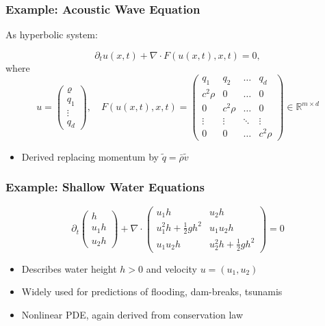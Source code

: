 \documentclass[aspectratio=169,11pt]{beamer}
\theoremstyle{definition}
\begin{document}
\begin{frame}
\frametitle{Example: Acoustic Wave Equation}
As hyperbolic system:

$$\partial_t u(x,t) + \nabla\cdot F(u(x,t),x,t) = 0,$$
where
$$u = \begin{pmatrix}
\varrho\\
q_1\\
\vdots\\
q_d
\end{pmatrix} ,\quad
F(u(x,t),x,t) = \left( \begin{matrix}
q_1  & q_2 & \dots & q_{d}\\
c^2\rho & 0 & \dots & 0\\
0 & c^2\rho & \dots & 0\\
\vdots & \vdots & \ddots & \vdots\\
0 & 0 & \dots & c^2\rho
\end{matrix} \right)\in \mathbb{R}^{m\times d} $$

\begin{itemize}
  \item Derived replacing momentum by $\tilde{q} = \bar{\rho} \tilde{v}$
\end{itemize}
\end{frame}


\begin{frame}
\frametitle{Example: Shallow Water Equations}

\begin{equation*}\label{eq:swe2D}
\partial_t \begin{pmatrix}
h\\
u_1h\\
u_2h
\end{pmatrix}+ \nabla\cdot
\left( \begin{matrix}
u_1h   & u_2h\\
u_1^2h + \frac{1}{2}gh^2 & u_1u_2h\\
u_1u_2h & u_2^2h + \frac{1}{2}gh^2
\end{matrix}\right) = 0
\end{equation*}

\begin{itemize}
  \item Describes water height $h>0$ and velocity $u=(u_1,u_2)$
  \item Widely used for predictions of flooding, dam-breaks, tsunamis
  \item Nonlinear PDE, again derived from conservation law
\end{itemize}
\end{frame}
\end{document}
